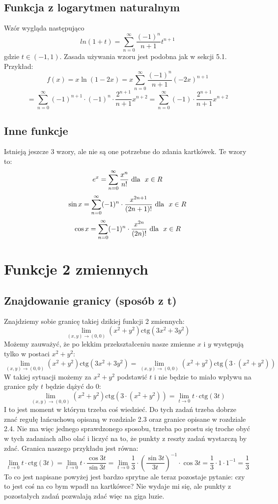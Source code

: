 \documentclass[11pt]{article}
\begin{document}
\subsection{Funkcja z logarytmen naturalnym}
\vbox{
    Wzór wygląda następująco
    \[
        ln(1 + t) = \sum_{n = 0}^{\infty} \frac{(-1)^{n}}{n + 1}t^{n+1}
    \]
    gdzie $t \in (-1, 1)$. 
    Zasada używania wzoru jest podobna jak w sekcji 5.1. Przykład:
    \[
        f(x) = x \ln(1 - 2x) = 
        x \sum_{n = 0}^{\infty} \frac{(-1)^{n}}{n + 1}(-2x)^{n+1}
    \]
    \[
        = \sum_{n = 0}^{\infty}(-1)^{n + 1} \cdot (-1)^{n} \cdot \frac{2^{n + 1}}{n + 1} x^{n + 2}
        = \sum_{n = 0}^{\infty} (-1) \cdot \frac{2^{n + 1}}{n + 1} x^{n + 2}
    \]
}

\subsection{Inne funkcje}
\vbox{
    Istnieją jeszcze 3 wzory, ale nie są one potrzebne do zdania kartkówek.
    Te wzory to:
    \[
        e^x = \sum_{n = 0}^{\infty} \frac{x^n}{n!} \text{\space dla \space} x \in R
    \]
    \[
        \sin{x} = \sum_{n = 0}^{\infty} (-1)^n \cdot \frac{x^{2n + 1}}{(2n + 1)!} \text{\space dla \space} x \in R
    \]
    \[
        \cos{x} = \sum_{n = 0}^{\infty} (-1)^n \cdot \frac{x^{2n}}{(2n)!} \text{\space dla \space} x \in R
    \]
}

\section{Funkcje 2 zmiennych}
\subsection{Znajdowanie granicy (sposób z t)}
\vbox{
    Znajdziemy sobie granicę takiej dzikiej funkcji 2 zmiennych:
    \[
        \lim_{(x,y) \to (0,0)}(x^2 + y^2) \text{ctg} (3x^2 + 3y^2)
    \]
    Możemy zauważyć, że po lekkim przekształceniu nasze zmienne $x$ i $y$ występują
    tylko w postaci $x^2 + y^2$:
    \[
        \lim_{(x,y) \to (0,0)}(x^2 + y^2) \text{ctg} (3x^2 + 3y^2) = 
        \lim_{(x,y) \to (0,0)}(x^2 + y^2) \text{ctg} (3 \cdot (x^2 + y^2))
    \]
    W takiej sytuacji możemy za $x^2 + y^2$ podstawić $t$ i nie będzie to miało wpływu
    na granice gdy $t$ będzie dążyć do $0$:
    \[ 
        \lim_{(x,y) \to (0,0)}(x^2 + y^2) \text{ctg} (3 \cdot (x^2 + y^2))
        = \lim_{t \to 0} t \cdot \text{ctg}(3t)
    \]
    I to jest moment w którym trzeba coś wiedzieć. Do tych zadań trzeba dobrze znać 
    regułę łańcuchową opisaną w rozdziale 2.3 oraz granice opisane w rozdziale 2.4.
    Nie ma więc jednego sprawdzonego sposobu, trzeba po prostu się troche obyć w tych zadaniach albo 
    olać i liczyć na to, że punkty z reszty zadań wystarczą by zdać. Granica naszego przykładu jest równa:
    \[ 
        \lim_{t \to 0} t \cdot \text{ctg}(3t) =
        \lim_{t \to 0} t \cdot \frac{\cos 3t}{\sin 3t} =
        \lim_{t \to 0} \frac{1}{3} \cdot (\frac{\sin 3t}{3t})^{-1} \cdot \cos 3t = 
        \frac{1}{3} \cdot 1 \cdot 1^{-1} = \frac{1}{3}
    \]
    To co jest napisane powyżej jest bardzo sprytne ale teraz pozostaje pytanie: czy to jest 
    coś na co bym wpadł na kartkówce? Nie wydaje mi się, ale punkty z pozostałych zadań pozwalają zdać
    więc na giga luzie.
}
\end{document}

